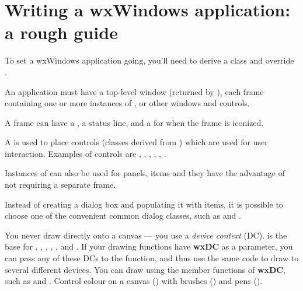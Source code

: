 \section{Writing a wxWindows application: a rough guide}\label{roughguide}

To set a wxWindows application going, you'll need to derive a  class and
override .

An application must have a top-level  window (returned by ),
each frame containing one or more instances of , \rtfsp
or other windows and controls.

A frame can have a , a status line, and a  for
when the frame is iconized.

A  is used to place controls (classes derived from )
which are used for user interaction. Examples of controls are ,
\rtfsp{}, , ,
\rtfsp{}, .

Instances of  can also be used for panels, items and they have
the advantage of not requiring a separate frame.

Instead of creating a dialog box and populating it with items, it is possible to choose
one of the convenient common dialog classes, such as \rtfsp
and .

You never draw directly onto a canvas --- you use a {\it device context} (DC).  is
the base for , , , ,
\rtfsp{},  and .
If your drawing functions have {\bf wxDC} as a parameter, you can pass any of these DCs
to the function, and thus use the same code to draw to several different devices.
You can draw using the member functions of {\bf wxDC}, such as \rtfsp
and . Control colour on a canvas () with
brushes () and pens ().

